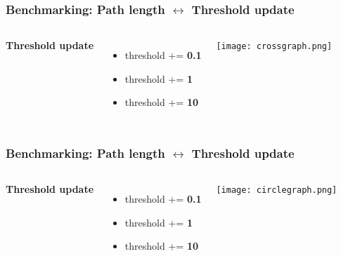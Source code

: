 \documentclass{beamer}
\begin{document}

\begin{frame}
\frametitle{Benchmarking: Path length $\leftrightarrow$ Threshold update}
\begin{columns}[c] %
\textbf{Threshold update}
\begin{itemize}
\item \textcolor{0.1}{threshold += \textbf{0.1}}
\item \textcolor{1}{threshold += \textbf{1}}
\item \textcolor{10}{threshold += \textbf{10}}
\end{itemize}

\begin{center}
	\texttt{[image: crossgraph.png]}
\end{center}
\end{columns}
\end{frame}


\begin{frame}
\frametitle{Benchmarking: Path length $\leftrightarrow$ Threshold update}
\begin{columns}[c] %
\textbf{Threshold update}
\begin{itemize}
\item \textcolor{0.1}{threshold += \textbf{0.1}}
\item \textcolor{1}{threshold += \textbf{1}}
\item \textcolor{10}{threshold += \textbf{10}}
\end{itemize}

\begin{center}
	\texttt{[image: circlegraph.png]}
\end{center}
\end{columns}
\end{frame}
\end{document}
